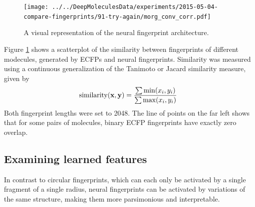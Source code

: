 \documentclass{article}
\newcommand{\vx}{\mathbf{x}}
\newcommand{\vy}{\mathbf{y}}
\begin{document}
\begin{figure}[h]
\centerline{\texttt{[image: ../../DeepMoleculesData/experiments/2015-05-04-compare-fingerprints/91-try-again/morg\_conv\_corr.pdf]}}
\caption{A visual representation of the neural fingerprint architecture.
}
\label{fig:fingerprint similarity}
\end{figure}

Figure \ref{fig:fingerprint similarity} shows a scatterplot of the similarity between fingerprints of different modecules, generated by ECFPs and neural fingerprints.
Similarity was measured using a continuous generalization of the Tanimoto or Jacard similarity measure, given by
\begin{equation}
\textnormal{similarity}(\vx, \vy) = \frac{\sum \min(x_i, y_i)}{\sum \max(x_i, y_i)}
\end{equation}
Both fingerprint lengths were set to 2048.
The line of points on the far left shows that for some pairs of molecules, binary ECFP fingerprints have exactly zero overlap.



\subsection{Examining learned features}

In contrast to circular fingerprints, which can each only be activated by a single fragment of a single radius, neural fingerprints can be activated by variations of the same structure, making them more parsimonious and interpretable.
\end{document}

